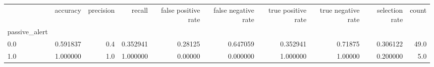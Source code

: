 \begin{tabular}{lrrrrrrrrr}
\toprule
{} &  accuracy &  precision &    recall &  false positive rate &  false negative rate &  true positive rate &  true negative rate &  selection rate &  count \\
passive\_alert &           &            &           &                      &                      &                     &                     &                 &        \\
\midrule
0.0           &  0.591837 &        0.4 &  0.352941 &              0.28125 &             0.647059 &            0.352941 &             0.71875 &        0.306122 &   49.0 \\
1.0           &  1.000000 &        1.0 &  1.000000 &              0.00000 &             0.000000 &            1.000000 &             1.00000 &        0.200000 &    5.0 \\
\bottomrule
\end{tabular}
